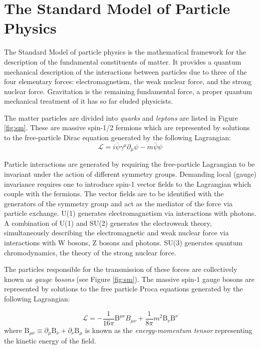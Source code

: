 \chapter{The Standard Model of Particle Physics}
\label{chap:sm}

The Standard Model of particle physics is the mathematical framework for the description of the fundamental constituents of matter. It provides a quantum mechanical description of the interactions between particles due to three of the four elementary forces: electromagnetism, the weak nuclear force, and the strong nuclear force. Gravitation is the remaining fundamental force, a proper quantum mechanical treatment of it has so far eluded physicists.

The matter particles are divided into \textit{quarks} and \textit{leptons} are listed in Figure \ref{fig:sm}. These are massive spin-1/2 fermions which are represented by solutions to the free-particle Dirac equation generated by the following Lagrangian:
\begin{equation}
\mathcal{L} = i\bar{\psi}\gamma^{\mu}\partial_{\mu}\psi - m\bar{\psi}\psi
\end{equation}

Particle interactions are generated by requiring the free-particle Lagrangian to be invariant under the action of different symmetry groups. Demanding local (gauge) invariance requires one to introduce spin-1 vector fields to the Lagrangian which couple with the fermions. The vector fields are to be identified with the generators of the symmetry group and act as the mediator of the force via particle exchange. U(1) generates electromagnetism via interactions with photons. A combination of U(1) and SU(2) generates the electroweak theory, simultaneously describing the electromagnetic and weak nuclear force via interactions with W bosons, Z bosons and photons. SU(3) generates quantum chromodynamics, the theory of the strong nuclear force.

The particles responsible for the transmission of these forces are collectively known as \textit{gauge bosons} (see Figure \ref{fig:sm}). The massive spin-1 gauge bosons are represented by solutions to the free particle Proca equations generated by the following Lagrangian:

\begin{equation}
\mathcal{L} = -\frac{1}{16\pi} \mathrm{B}^{\mu\nu}B_{\mu\nu} + \frac{1}{8\pi}m^{2}\mathrm{B}_{\nu}\mathrm{B}^{\nu}
\end{equation}
where $\mathrm{B}_{\mu\nu} \equiv \partial_{\mu}\mathrm{B}_{\nu} + \partial_{\nu}\mathrm{B}_{\mu}$ is known as the \textit{energy-momentum tensor} representing the kinetic energy of the field.


